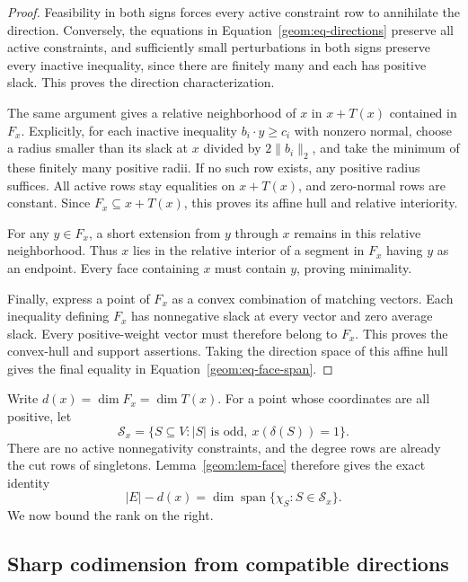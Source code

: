 \begin{proof}
Feasibility in both signs forces every active constraint row to
annihilate the direction. Conversely, the equations in
Equation~\eqref{geom:eq-directions} preserve all active constraints,
and sufficiently small perturbations in both signs preserve every
inactive inequality, since there are finitely many and each has
positive slack. This proves the direction characterization.

The same argument gives a relative neighborhood of \(x\) in
\(x+T(x)\) contained in \(F_x\). Explicitly, for each inactive
inequality \(b_i\cdot y\ge c_i\) with nonzero normal, choose a
radius smaller than its slack at \(x\) divided by \(2\|b_i\|_2\),
and take the minimum of these finitely many positive radii. If no
such row exists, any positive radius suffices. All active rows stay
equalities on \(x+T(x)\), and zero-normal rows are constant.
Since \(F_x\subseteq x+T(x)\), this proves its affine hull and
relative interiority.

For any \(y\in F_x\), a short extension from \(y\) through \(x\)
remains in this relative neighborhood. Thus \(x\) lies in the
relative interior of a segment in \(F_x\) having \(y\) as an
endpoint. Every face containing \(x\) must contain \(y\), proving
minimality.

Finally, express a point of \(F_x\) as a convex combination of
matching vectors. Each inequality defining \(F_x\) has nonnegative
slack at every vector and zero average slack. Every positive-weight
vector must therefore belong to \(F_x\). This proves the convex-hull
and support assertions. Taking the direction space of this affine
hull gives the final equality in
Equation~\eqref{geom:eq-face-span}.
\end{proof}

Write \(d(x)=\dim F_x=\dim T(x)\). For a point whose coordinates
are all positive, let
\[
 \mathcal S_x=\{S\subseteq V:|S|\text{ is odd},\
                                x(\delta(S))=1\}.
\]
There are no active nonnegativity constraints, and the degree rows
are already the cut rows of singletons. Lemma~\ref{geom:lem-face}
therefore gives the exact identity
\begin{equation}
\label{geom:eq-rank}
 |E|-d(x)=\dim\operatorname{span}\{\chi_S:S\in\mathcal S_x\}.
\end{equation}
We now bound the rank on the right.

\subsection{Sharp codimension from compatible directions}

